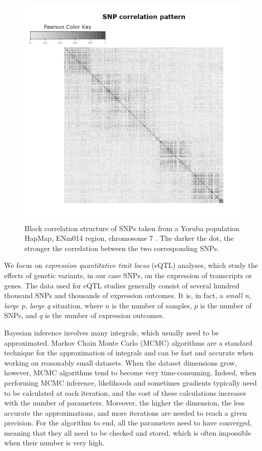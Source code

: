 \documentclass[a4paper, 11pt]{report}
\numberwithin{equation}{chapter}
\begin{document}
\begin{figure}[h!]
\centering
\includegraphics[width=5in]{images/corrRealSNPs.pdf}
\caption{\label{fig:corr} Block correlation structure of SNPs taken from a Yoruba population HapMap, ENm014 region, chromosome $7$ \citep{hapmap}. The darker the dot, the stronger the correlation between the two corresponding SNPs.}
\end{figure}

We focus on \textit{expression quantitative trait locus} (eQTL) analyses, which study the effects of genetic variants, in our case SNPs, on the expression of transcripts or genes. The data used for eQTL studies generally consist of several hundred thousand SNPs and thousands of expression outcomes. It is, in fact, a \textit{small n, large p, large q} situation, where $n$ is the number of samples, $p$ is the number of SNPs, and $q$ is the number of expression outcomes.

Bayesian inference involves many integrals, which usually need to be approximated. Markov Chain Monte Carlo (MCMC) algorithms are a standard technique for the approximation of integrals and can be fast and accurate when working on reasonably small datasets. When the dataset dimensions grow, however, MCMC algorithms tend to become very time-consuming. Indeed, when performing MCMC inference, likelihoods and sometimes gradients typically need to be calculated at each iteration, and the cost of these calculations increases with the number of parameters. Moreover, the higher the dimension, the less accurate the approximations, and more iterations are needed to reach a given precision. For the algorithm to end, all the parameters need to have converged, meaning that they all need to be checked and stored, which is often impossible when their number is very high.
\end{document}
